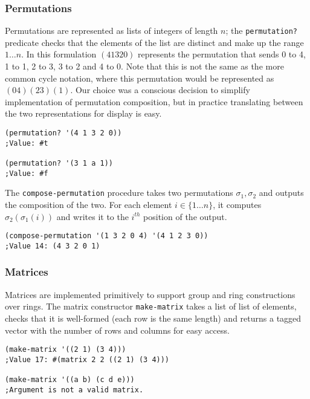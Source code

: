 \documentclass{article}
\begin{document}
            \subsubsection{Permutations}
            \label{permutations}
				
				Permutations are represented as lists of integers of length $n$; the \texttt{permutation?} predicate checks that the elements of the list are distinct and make up the range $1 \ldots n$. In this formulation $(4 1 3 2 0)$ represents the permutation that sends 0 to 4, 1 to 1, 2 to 3, 3 to 2 and 4 to 0. Note that this is not the same as the more common cycle notation, where this permutation would be represented as $(0 4) (2 3) (1)$. Our choice was a conscious decision to simplify implementation of permutation composition, but in practice translating between the two representations for display is easy.

\begin{verbatim}
(permutation? '(4 1 3 2 0))
;Value: #t

(permutation? '(3 1 a 1))
;Value: #f
\end{verbatim}
				
				The \texttt{compose-permutation} procedure takes two permutations $\sigma_1, \sigma_2$ and outputs the composition of the two. For each element $i \in \{1 \ldots n\}$, it computes $\sigma_2(\sigma_1(i))$ and writes it to the $i^{th}$ position of the output.

\begin{verbatim}
(compose-permutation '(1 3 2 0 4) '(4 1 2 3 0))
;Value 14: (4 3 2 0 1)
\end{verbatim}

            \subsubsection{Matrices}

				Matrices are implemented primitively to support group and ring constructions over rings. The matrix constructor \texttt{make-matrix} takes a list of list of elements, checks that it is well-formed (each row is the same length) and returns a tagged vector with the number of rows and columns for easy access.

\begin{verbatim}
(make-matrix '((2 1) (3 4)))
;Value 17: #(matrix 2 2 ((2 1) (3 4)))

(make-matrix '((a b) (c d e)))
;Argument is not a valid matrix.
\end{verbatim}
				
\end{document}
